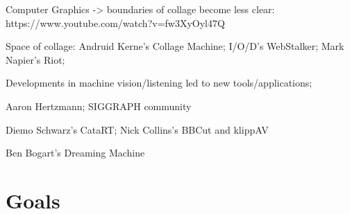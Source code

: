 \documentclass[a4paper,11pt,final]{ThesisStyle}
\begin{document}
Computer Graphics -> boundaries of collage become less clear: https://www.youtube.com/watch?v=fw3XyOyl47Q

Space of collage: Andruid Kerne's Collage Machine; I/O/D's WebStalker; Mark Napier's Riot; 

Developments in machine vision/listening led to new tools/applications;

Aaron Hertzmann; SIGGRAPH community

Diemo Schwarz's CataRT; Nick Collins's BBCut and klippAV

Ben Bogart's Dreaming Machine


\section{Goals}
\end{document}
